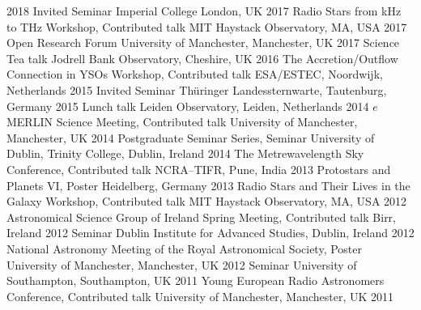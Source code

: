 \begin{cvpress}
    {2018}
   \cvpres
    {Invited Seminar}
    {Imperial College London, UK}
    {2017}
   \cvpres
    {Radio Stars from kHz to THz Workshop, Contributed talk}
    {MIT Haystack Observatory, MA, USA}
    {2017}
   \cvpres
    {Open Research Forum}
    {University of Manchester, Manchester, UK}
    {2017}
  \cvpres
  {Science Tea talk}
  {Jodrell Bank Observatory, Cheshire, UK}
  {2016}
  \cvpres
    {The Accretion/Outflow Connection in YSOs Workshop, Contributed talk}
    {ESA/ESTEC, Noordwijk, Netherlands}
    {2015}
  \cvpres
    {Invited Seminar}
    {Th{\"u}ringer Landessternwarte, Tautenburg, Germany}
    {2015}
  \cvpres
    {Lunch talk}
    {Leiden Observatory, Leiden, Netherlands}
    {2014}
  \cvpres
    {$e$MERLIN Science Meeting, Contributed talk}
    {University of Manchester, Manchester, UK}
    {2014}
  \cvpres
    {Postgraduate Seminar Series, Seminar}
    {University of Dublin, Trinity College, Dublin, Ireland}
    {2014}
   \cvpres
   	{The Metrewavelength Sky Conference, Contributed talk}
    {NCRA--TIFR, Pune, India}
    {2013}
   \cvpres
   	{Protostars and Planets VI, Poster}
    {Heidelberg, Germany}
    {2013}
   \cvpres
   	{Radio Stars and Their Lives in the Galaxy Workshop, Contributed talk}
    {MIT Haystack Observatory, MA, USA}
    {2012}
   \cvpres
   	{Astronomical Science Group of Ireland Spring Meeting, Contributed talk}
    {Birr, Ireland}
    {2012}
   \cvpres
   	{Seminar}
    {Dublin Institute for Advanced Studies, Dublin, Ireland}
    {2012}
   \cvpres
   	{National Astronomy Meeting of the Royal Astronomical Society, Poster}
    {University of Manchester, Manchester, UK}
    {2012}
   \cvpres
   	{Seminar}
    {University of Southampton, Southampton, UK}
    {2011}
   \cvpres
   	{Young European Radio Astronomers Conference, Contributed talk}
    {University of Manchester, Manchester, UK}
    {2011}
\end{cvpress}

